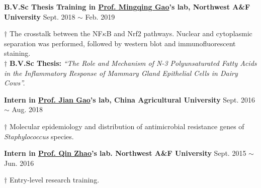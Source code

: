 \vspace{5pt}


\textbf{B.V.Sc Thesis Training in \href{https://faculty.nwu.edu.cn/gaomingqing/zh_CN/index.htm}{Prof. Mingqing Gao}'s lab, Northwest A\&F University} \hfill Sept. 2018 $\sim$ Feb. 2019

{\small
$\dagger$ The crosstalk between the NF$\kappa$B and Nrf2 pathways. Nuclear and cytoplasmic separation was performed, followed by western blot and immunofluorescent staining.\\
$\dagger$ \textbf{B.V.Sc Thesis:} \textit{``The Role and Mechanism of N-3 Polyunsaturated Fatty Acids in the Inflammatory Response of Mammary Gland Epithelial Cells in Dairy Cows''.}
}


\vspace{5pt}


\textbf{Intern in \href{https://cvm.cau.edu.cn/art/2017/9/12/art_41957_71.html}{Prof. Jian Gao}'s lab, China Agricultural University} \hfill Sept. 2016 $\sim$ Aug. 2018

{\small
$\dagger$ Molecular epidemiology and distribution of antimicrobial resistance genes of \textit{Staphylococcus} species\cite{zhao2018detection,qu2019molecular}.
}

\vspace{5pt}

\textbf{Intern in \href{https://dyxy.nwsuaf.edu.cn/en/People/FullProfessor/5e6012bf013a499c946289472b285795.htm}{Prof. Qin Zhao}'s lab. Northwest A\&F University} \hfill Sept. 2015 $\sim$ Jun. 2016

{\small
$\dagger$ Entry-level research training.
}